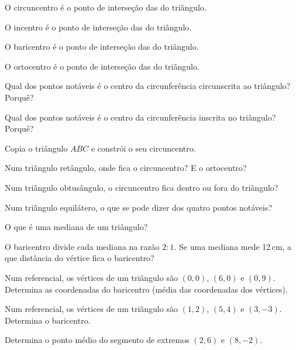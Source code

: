 \documentclass[12pt]{article}
\begin{document}
\begin{exercicios}
  \item O circuncentro é o ponto de interseção das \underline{\hspace{3cm}} do triângulo.
  \item O incentro é o ponto de interseção das \underline{\hspace{3cm}} do triângulo.
  \item O baricentro é o ponto de interseção das \underline{\hspace{3cm}} do triângulo.
  \item O ortocentro é o ponto de interseção das \underline{\hspace{3cm}} do triângulo.
  \item Qual dos pontos notáveis é o centro da circunferência circunscrita ao triângulo? Porquê?
  \item Qual dos pontos notáveis é o centro da circunferência inscrita no triângulo? Porquê?
  \item Copia o triângulo $ABC$ e constrói o seu circuncentro.
  \item Num triângulo retângulo, onde fica o circuncentro? E o ortocentro?
  \item Num triângulo obtusângulo, o circuncentro fica dentro ou fora do triângulo?
  \item Num triângulo equilátero, o que se pode dizer dos quatro pontos notáveis?
\end{exercicios}

\begin{exercicios}
  \item O que é uma mediana de um triângulo?
  \item O baricentro divide cada mediana na razão $2:1$. Se uma mediana mede 12\,cm, a que distância do vértice fica o baricentro?
  \item Num referencial, os vértices de um triângulo são $(0,0)$, $(6,0)$ e $(0,9)$. Determina as coordenadas do baricentro (média das coordenadas dos vértices).
  \item Num referencial, os vértices de um triângulo são $(1,2)$, $(5,4)$ e $(3,-3)$. Determina o baricentro.
  \item Determina o ponto médio do segmento de extremos $(2, 6)$ e $(8, -2)$.
\end{exercicios}
\end{document}
